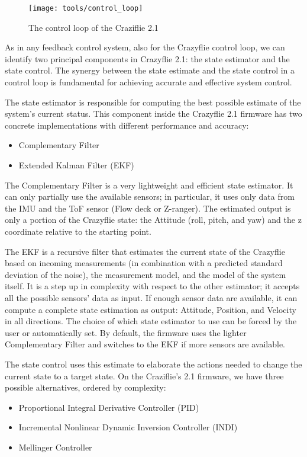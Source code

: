 \begin{figure}[t]
    \centering
    \texttt{[image: tools/control\_loop]}
    \caption[Craziflie's control loop]{
        The control loop of the Craziflie 2.1~\cite{bitcraze}
    }\label{fig:control_loop}
\end{figure}

As in any feedback control system, also for the Crazyflie control loop, we can identify two principal components in Crazyflie 2.1: the state estimator and the state control. 
The synergy between the state estimate and the state control in a control loop is fundamental for achieving accurate and effective system control. 

The state estimator is responsible for computing the best possible estimate of the system's current status.
This component inside the Crazyflie 2.1 firmware has two concrete implementations with different performance and accuracy:
\begin{itemize}
    \item Complementary Filter
    \item Extended Kalman Filter (EKF)
\end{itemize}

The Complementary Filter is a very lightweight and efficient state estimator. 
It can only partially use the available sensors; in particular, it uses only data from the IMU and the ToF sensor (Flow deck or Z-ranger).
The estimated output is only a portion of the Crazyflie state: the Attitude (roll, pitch, and yaw) and the z coordinate relative to the starting point.

The EKF is a recursive filter that estimates the current state of the Crazyflie based on incoming measurements (in combination with a predicted standard deviation of the noise), the measurement model, and the model of the system itself. 
It is a step up in complexity with respect to the other estimator; it accepts all the possible sensors' data as input. 
If enough sensor data are available, it can compute a complete state estimation as output: Attitude, Position, and Velocity in all directions.
The choice of which state estimator to use can be forced by the user or automatically set. 
By default, the firmware uses the lighter Complementary Filter and switches to the EKF if more sensors are available.

The state control uses this estimate to elaborate the actions needed to change the current state to a target state.
On the Craziflie's 2.1 firmware, we have three possible alternatives, ordered by complexity:
\begin{itemize}
    \item Proportional Integral Derivative Controller (PID)
    \item Incremental Nonlinear Dynamic Inversion Controller (INDI)
    \item Mellinger Controller
\end{itemize}

